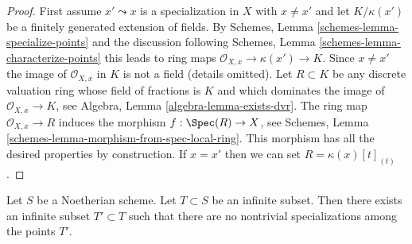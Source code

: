 \begin{proof}
First assume $x' \leadsto x$ is a specialization in $X$
with $x \not = x'$ and let $K/\kappa(x')$ be a finitely
generated extension of fields. By
Schemes, Lemma \ref{schemes-lemma-specialize-points}
and the discussion following
Schemes, Lemma \ref{schemes-lemma-characterize-points}
this leads to ring maps $\mathcal{O}_{X, x} \to \kappa(x') \to K$.
Since $x \not = x'$ the image of $\mathcal{O}_{X, x}$ in $K$
is not a field (details omitted).
Let $R \subset K$ be any discrete valuation ring whose field of fractions is
$K$ and which dominates the image of $\mathcal{O}_{X, x} \to K$, see
Algebra, Lemma \ref{algebra-lemma-exists-dvr}.
The ring map $\mathcal{O}_{X, x} \to R$ induces the morphism
$f : \Spec(R) \to X$, see
Schemes, Lemma \ref{schemes-lemma-morphism-from-spec-local-ring}.
This morphism has all the desired properties by construction.
If $x = x'$ then we can set $R = \kappa(x)[t]_{(t)}$.
\end{proof}

\begin{lemma}
\label{lemma-thin-infinite-sequence}
Let $S$ be a Noetherian scheme. Let $T \subset S$ be an infinite subset.
Then there exists an infinite subset $T' \subset T$
such that there are no nontrivial specializations among the points $T'$.
\end{lemma}

